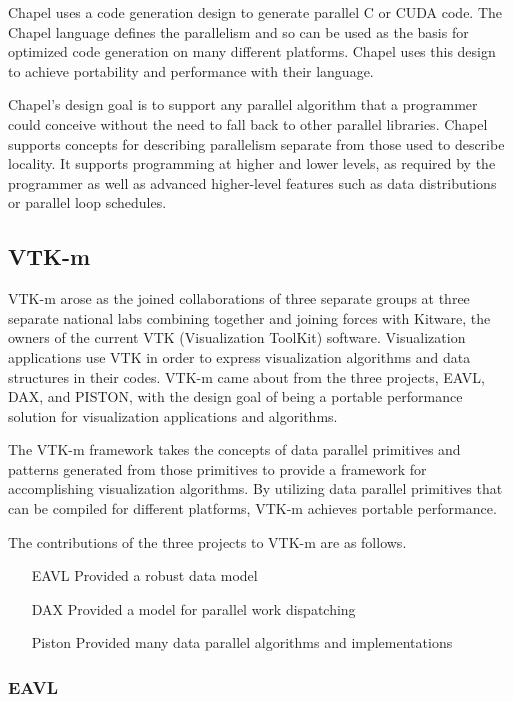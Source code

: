 Chapel uses a code generation design to generate parallel C or CUDA code.
%
The Chapel language defines the parallelism and so can be used as the basis for optimized code generation on many different platforms.
%
Chapel uses this design to achieve portability and performance with their language.

Chapel's design goal is to support any parallel algorithm that a programmer could conceive without the need to fall back to other parallel libraries.
%
Chapel supports concepts for describing parallelism separate from those used to describe locality.
%
It supports programming at higher and lower levels, as required by the programmer as well as advanced higher-level features such as data distributions or parallel loop schedules.
%
~\cite{bradchamberlain2013}


\subsection*{\textbf{VTK-m}}

VTK-m arose as the joined collaborations of three separate groups at three separate national labs combining together and joining forces with Kitware, the owners of the current VTK (Visualization ToolKit) software.
%
Visualization applications use VTK in order to express visualization algorithms and data structures in their codes.
%
VTK-m came about from the three projects, EAVL, DAX, and PISTON, with the design goal of being a portable performance solution for visualization applications and algorithms.
%

The VTK-m framework takes the concepts of data parallel primitives and patterns generated from those primitives to provide a framework for accomplishing visualization algorithms.
%
By utilizing data parallel primitives that can be compiled for different platforms, VTK-m achieves portable performance.
% 
\cite{moreland2015vtk}
\cite{moreland2014vtk}

The contributions of the three projects to VTK-m are as follows.

\begin{itemize}
\item[EAVL] Provided a robust data model
\item[DAX] Provided a model for parallel work dispatching
\item[Piston] Provided many data parallel algorithms and implementations
\end{itemize}

\subsubsection*{\textbf{EAVL}}

